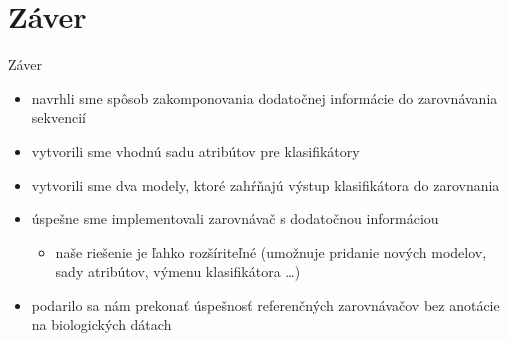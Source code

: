 \documentclass[xcolor=dvipsnames, compress, 12pt]{beamer}
\theoremstyle{definition}
\begin{document}

\section{Záver}
\begin{frame}{Záver}
  \begin{itemize}
    \item navrhli sme spôsob zakomponovania dodatočnej informácie do zarovnávania sekvencií
    \item vytvorili sme vhodnú sadu atribútov pre klasifikátory
    \item vytvorili sme dva modely, ktoré zahŕňajú výstup klasifikátora do zarovnania
    \item úspešne sme implementovali zarovnávač s dodatočnou informáciou
    \begin{itemize}
      \item naše riešenie je ľahko rozšíriteľné (umožnuje pridanie nových modelov, sady atribútov, výmenu klasifikátora \dots)
    \end{itemize}
    \item podarilo sa nám prekonať úspešnosť referenčných zarovnávačov bez anotácie na biologických dátach
  \end{itemize}
\end{frame}
\end{document}

